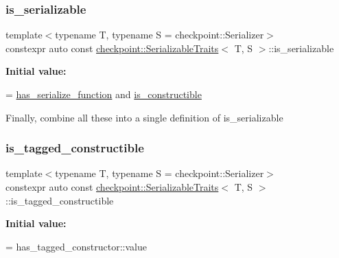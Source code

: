 \subsubsection{\texorpdfstring{is\+\_\+serializable}{is\_serializable}}
{\footnotesize\ttfamily template$<$typename T, typename S = checkpoint\+::\+Serializer$>$ \\
constexpr auto const \hyperlink{structcheckpoint_1_1_serializable_traits}{checkpoint\+::\+Serializable\+Traits}$<$ T, S $>$\+::is\+\_\+serializable\hspace{0.3cm}{\ttfamily [static]}}

{\bfseries Initial value\+:}
\begin{DoxyCode}
=
    \hyperlink{structcheckpoint_1_1_serializable_traits_a4d17a7627a8e033cccb5cf4e6b8fd0dc}{has\_serialize\_function} and \hyperlink{structcheckpoint_1_1_serializable_traits_a7720e2f57d1b3d2f87fd022b47d0b775}{is\_constructible}
\end{DoxyCode}
Finally, combine all these into a single definition of is\+\_\+serializable \mbox{\label{structcheckpoint_1_1_serializable_traits_aa6618d9f36e37127006112c73755fceb}} 
\subsubsection{\texorpdfstring{is\+\_\+tagged\+\_\+constructible}{is\_tagged\_constructible}}
{\footnotesize\ttfamily template$<$typename T, typename S = checkpoint\+::\+Serializer$>$ \\
constexpr auto const \hyperlink{structcheckpoint_1_1_serializable_traits}{checkpoint\+::\+Serializable\+Traits}$<$ T, S $>$\+::is\+\_\+tagged\+\_\+constructible\hspace{0.3cm}{\ttfamily [static]}}

{\bfseries Initial value\+:}
\begin{DoxyCode}
=
    has\_tagged\_constructor::value
\end{DoxyCode}
\mbox{\label{structcheckpoint_1_1_serializable_traits_a426639501cd0ce23cb14c7b2ff982fc1}} 
